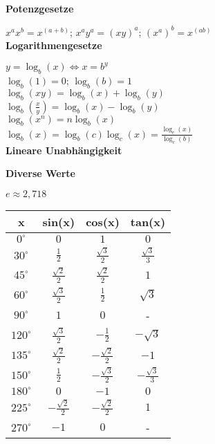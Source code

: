 \documentclass[10pt,twocolumn,a4paper]{article}
\begin{document}
\begin{flushleft}
\textbf{Potenzgesetze}

$x^a x^b  = x^{\left( {a + b} \right)}$;
$x^a y^a  = \left( {xy} \right)^a$;
$\left( {x^a } \right)^b  = x^{\left( {ab} \right)}$\\

\textbf{Logarithmengesetze}

$y = \log _b \left( x \right) \Leftrightarrow x = b^y$\\
$\log _b \left( 1 \right) = 0$; $\log _b \left( b \right) = 1$\\
$\log _b \left( {xy} \right) = \log _b \left( x \right) + \log _b \left( y \right)$\\
$\log _b \left( {\frac{x}{y}} \right) = \log _b \left( x \right) - \log _b \left( y \right)$\\
$\log _b \left( {x^n } \right) = n\log _b \left( x \right)$\\
$\log _b \left( x \right) = \log _b \left( c \right)\log _c \left( x \right) = \frac{{\log _c \left( x \right)}}{{\log _c \left( b \right)}}$\\

\textbf{Lineare Unabhängigkeit}

\textbf{Diverse Werte}

$e \approx 2,718$\\
\begin{tabular}{|c|c|c|c|}
\hline
\rule[-1ex]{0pt}{2.5ex} x & sin(x) & cos(x) & tan(x) \\
\hline
\rule[-1ex]{0pt}{2.5ex} $0^\circ$ & $0$ & $1$ & $0$ \\
\hline
\rule[-1ex]{0pt}{2.5ex} $30^\circ$ & $\frac{1}{2}$ & $\frac{\sqrt{3}}{2}$ & $\frac{\sqrt{3}}{3}$ \\
\hline
\rule[-1ex]{0pt}{2.5ex} $45^\circ$ & $\frac{\sqrt{2}}{2}$ & $\frac{\sqrt{2}}{2}$ & $1$ \\
\hline
\rule[-1ex]{0pt}{2.5ex} $60^\circ$ & $\frac{\sqrt{3}}{2}$ & $\frac{1}{2}$ & $\sqrt{3}$ \\
\hline
\rule[-1ex]{0pt}{2.5ex} $90^\circ$ & $1$ & $0$ & - \\
\hline
\rule[-1ex]{0pt}{2.5ex} $120^\circ$ & $\frac{\sqrt{3}}{2}$ & $-\frac{1}{2}$ & $-\sqrt{3}$ \\
\hline
\rule[-1ex]{0pt}{2.5ex} $135^\circ$ & $\frac{\sqrt{2}}{2}$ & $-\frac{\sqrt{2}}{2}$ & $-1$ \\
\hline
\rule[-1ex]{0pt}{2.5ex} $150^\circ$ & $\frac{1}{2}$ & $-\frac{\sqrt{3}}{2}$ & $-\frac{\sqrt{3}}{3}$ \\
\hline
\rule[-1ex]{0pt}{2.5ex} $180^\circ$ & $0$ & $-1$ & $0$ \\
\hline
\rule[-1ex]{0pt}{2.5ex} $225^\circ$ & $-\frac{\sqrt{2}}{2}$ & $-\frac{\sqrt{2}}{2}$ & $1$ \\
\hline
\rule[-1ex]{0pt}{2.5ex} $270^\circ$ & $-1$ & $0$ & - \\
\hline
\end{tabular}


\end{flushleft}
\end{document}
